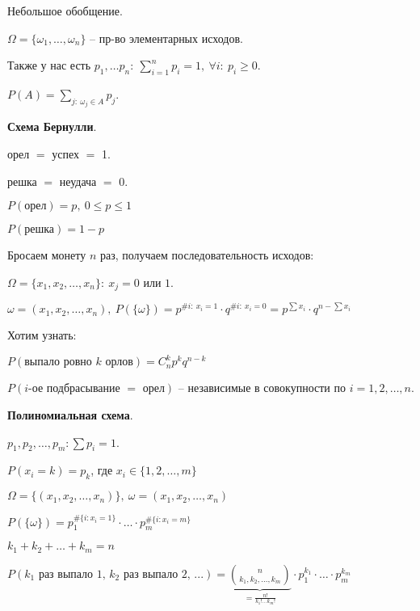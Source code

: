 \begin{remark}
    Небольшое обобщение.

    $\Omega = \{ \omega_1, \dots, \omega_n \}$ -- пр-во элементарных исходов.

    Также у нас есть $p_1, \dots p_n: \ \sum_{i=1}^{n} p_i = 1, \ \forall i: \ p_i \geq 0$.

    $P(A) = \sum_{j: \ \omega_j \in A} p_j$.
\end{remark}

\begin{theorem}
    \textbf{Схема Бернулли}.

    орел $=$ успех $=$ 1.

    решка $=$ неудача $=$ 0.

    $P(\text{орел}) = p, \ 0 \leq p \leq 1$
    
    $P(\text{решка}) = 1 - p$

    Бросаем монету $n$ раз, получаем последовательность исходов:

    $\Omega = \{ x_1, x_2, \dots, x_n \}: \ x_j = 0 \text{ или } 1$.

    $\omega = (x_1, x_2, \dots, x_n), \ P(\{ \omega \}) = p^{\# i: \ x_i = 1} \cdot q^{\# i: \ x_i = 0} = p^{\sum x_i} \cdot q^{n - \sum x_i}$

    Хотим узнать:
    
    $P(\text{выпало ровно } k \text{ орлов}) = C_{n}^{k} p^k q^{n - k}$
    
    $P(i\text{-ое подбрасывание } = \text{ орел})$ -- независимые в совокупности по $i = 1, 2, \dots, n$.
\end{theorem}

\begin{theorem}
    \textbf{Полиномиальная схема}.

    $p_1, p_2, \dots, p_m: \sum p_i = 1$.

    $P(x_i = k) = p_k$, где $x_i \in \{ 1, 2, \dots, m \}$

    $\Omega = \{(x_1, x_2, \dots, x_n)\}, \ \omega = (x_1, x_2, \dots, x_n)$

    $P(\{ \omega \}) = p_1^{\# \{ i: x_i = 1 \}} \cdot \dots \cdot p_m^{\# \{ i: x_i = m \}}$

    $k_1 + k_2 + \dots + k_m = n$

    
    $P(k_1 \text{ раз выпало 1, } k_2 \text{ раз выпало 2, ...}) = \underbrace{\binom{n}{k_1, k_2, \dots, k_m}}_{= \frac{n!}{k_1! \dots k_m!}} \cdot p_1^{k_1} \cdot \dots \cdot p_m^{k_m}$
\end{theorem}

